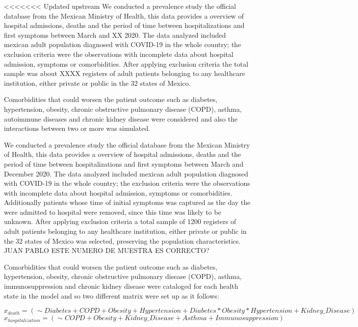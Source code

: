 \documentclass[
]{article}
\begin{document}
\textless\textless\textless\textless\textless\textless\textless{}
Updated upstream We conducted a prevalence study the official database
from the Mexican Ministry of Health, this data provides a overview of
hospital admissions, deaths and the period of time between
hospitalizations and first symptoms between March and XX 2020. The data
analyzed included mexican adult population diagnosed with COVID-19 in
the whole country; the exclusion criteria were the observations with
incomplete data about hospital admission, symptoms or comorbidities.
After applying exclusion criteria the total sample was about XXXX
registers of adult patients belonging to any healthcare institution,
either private or public in the 32 states of Mexico.

Comorbidities that could worsen the patient outcome such as diabetes,
hypertension, obesity, chronic obstructive pulmonary disease (COPD),
asthma, autoimmune diseases and chronic kidney disease were considered
and also the interactions between two or more was simulated.

We conducted a prevalence study the official database from the Mexican
Ministry of Health, this data provides a overview of hospital
admissions, deaths and the period of time between hospitalizations and
first symptoms between March and December 2020. The data analyzed
included mexican adult population diagnosed with COVID-19 in the whole
country; the exclusion criteria were the observations with incomplete
data about hospital admission, symptoms or comorbidities. Additionally
patients whose time of initial symptoms was captured as the day the were
admitted to hospital were removed, since this time was likely to be
unknown. After applying exclusion criteria a total sample of 1200
registers of adult patients belonging to any healthcare institution,
either private or public in the 32 states of Mexico was selected,
preserving the population characteristics. JUAN PABLO ESTE NUMERO DE
MUESTRA ES CORRECTO?

Comorbidities that could worsen the patient outcome such as diabetes,
hypertension, obesity, chronic obstructive pulmonary disease (COPD),
asthma, immunosuppression and chronic kidney disease were cataloged for
each health state in the model and so two different matrix were set up
as it follows:

\[x_{death} = (\sim Diabetes+COPD+Obesity+Hypertension+Diabetes*Obesity*Hypertension+Kidney\_Disease)\]
\[x_{hospitalization} = (\sim COPD+Obesity+Kidney\_Disease+Asthma+Immunosuppression)
\]
\end{document}
